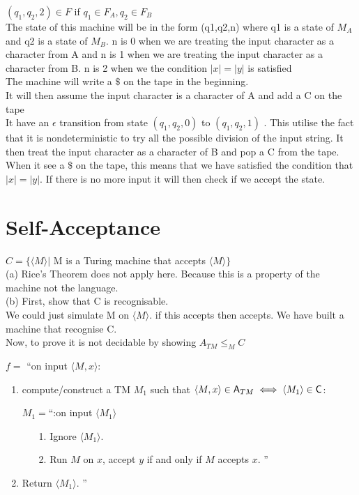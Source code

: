 \documentclass[12pt]{article}
\begin{document}
$(q_1,q_2,2) \in F$ if $q_1 \in F_A, q_2 \in F_B$\\

The state of this machine will be in the form (q1,q2,n) where q1 is a state of $M_A$ and q2 is a state of $M_B$. n is 0 when we are treating the input character as a character from A and n is 1 when we are treating the input character as a character from B. n is 2 when we the condition $|x| = |y|$ is satisfied\\

The machine will write a $\$$ on the tape in the beginning. \\
It will then assume the input character is a character of A  and  add a C on the tape\\
It have an $\epsilon$ transition from state $(q_1,q_2,0)$ to $(q_1,q_2,1)$ . This utilise the fact that it is nondeterministic to try all the possible division of the input string.
It then treat the input character as a character of B and pop a C from the tape.
When it see a $\$$ on the tape, this means that we have satisfied the condition that $|x| = |y|$. If there is no more input it will then check if we  accept the state.

\pagebreak
\section{Self-Acceptance}

$C = \{\langle M \rangle |$ M is a  Turing machine that accepts $\langle M \rangle \}$\\

(a) Rice’s Theorem does not apply here. Because this is a property of the machine not the language.\\

(b)
First, show that C is recognisable.\\
We could just simulate M on $\langle M \rangle$. if this accepts then accepts. We have built a machine that recognise C.\\

Now, to prove it is not decidable by showing $A_{TM}\le_M C$











$f=$ ``on input $\langle M,x\rangle$:
\begin{enumerate}
    \item compute/construct a TM $M_1$ such that $\langle M,x \rangle \in {\sf A}_{TM} \iff \langle M_1 \rangle \in  {\sf C}$:

$M_1=$``:on input $\langle M_1 \rangle $
\vspace*{-10pt}
\begin{itemize}
\item[1.] Ignore  $\langle M_1 \rangle$.
\item[2.] Run $M$ on $x$, accept $y$ if and only if $M$ accepts $x$. ''
\end{itemize}
\vspace*{-10pt}
\item Return $\langle M_1\rangle$. ''
\end{enumerate}
\end{document}
